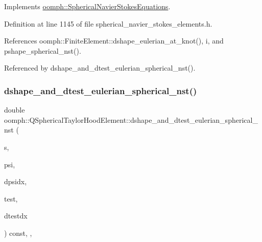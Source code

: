 Implements \hyperlink{classoomph_1_1SphericalNavierStokesEquations_a10ed6f34245f5b31095ae636fc08749a}{oomph\+::\+Spherical\+Navier\+Stokes\+Equations}.



Definition at line 1145 of file spherical\+\_\+navier\+\_\+stokes\+\_\+elements.\+h.



References oomph\+::\+Finite\+Element\+::dshape\+\_\+eulerian\+\_\+at\+\_\+knot(), i, and pshape\+\_\+spherical\+\_\+nst().



Referenced by dshape\+\_\+and\+\_\+dtest\+\_\+eulerian\+\_\+spherical\+\_\+nst().

\mbox{\label{classoomph_1_1QSphericalTaylorHoodElement_ad6ac4efe30e2d18801f17f000db47a25}} 
\subsubsection{\texorpdfstring{dshape\+\_\+and\+\_\+dtest\+\_\+eulerian\+\_\+spherical\+\_\+nst()}{dshape\_and\_dtest\_eulerian\_spherical\_nst()}}
{\footnotesize\ttfamily double oomph\+::\+Q\+Spherical\+Taylor\+Hood\+Element\+::dshape\+\_\+and\+\_\+dtest\+\_\+eulerian\+\_\+spherical\+\_\+nst (\begin{DoxyParamCaption}\item[{const \hyperlink{classoomph_1_1Vector}{Vector}$<$ double $>$ \&}]{s,  }\item[{\hyperlink{classoomph_1_1Shape}{Shape} \&}]{psi,  }\item[{\hyperlink{classoomph_1_1DShape}{D\+Shape} \&}]{dpsidx,  }\item[{\hyperlink{classoomph_1_1Shape}{Shape} \&}]{test,  }\item[{\hyperlink{classoomph_1_1DShape}{D\+Shape} \&}]{dtestdx }\end{DoxyParamCaption}) const\hspace{0.3cm}{\ttfamily [inline]}, {\ttfamily [protected]}, {\ttfamily [virtual]}}



